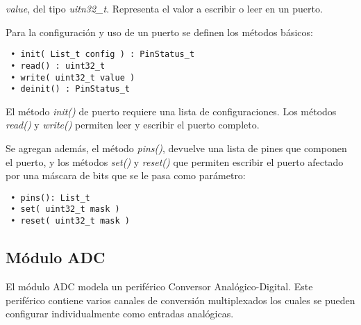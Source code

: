 
\emph{value}, del tipo \emph{uitn32\_t}. Representa el valor a escribir o leer en un puerto.


Para la configuración y uso de un puerto se definen los métodos básicos:

\begin{verbatim}
 • init( List_t config ) : PinStatus_t
 • read() : uint32_t
 • write( uint32_t value )
 • deinit() : PinStatus_t
\end{verbatim}

El método \emph{init()} de puerto requiere una lista de configuraciones.
Los métodos \emph{read()} y \emph{write()} permiten leer y escribir el puerto completo.

Se agregan además, el método \emph{pins()}, devuelve una lista de pines que componen el puerto, y los métodos \emph{set()} y \emph{reset()} que permiten escribir el puerto afectado por una máscara de bits que se le pasa como parámetro:

\begin{verbatim}
 • pins(): List_t
 • set( uint32_t mask )
 • reset( uint32_t mask )
\end{verbatim}

\subsection{Módulo ADC}

El módulo ADC modela un periférico Conversor Analógico-Digital. Este periférico contiene varios canales de conversión multiplexados los cuales se pueden configurar individualmente como entradas analógicas.


